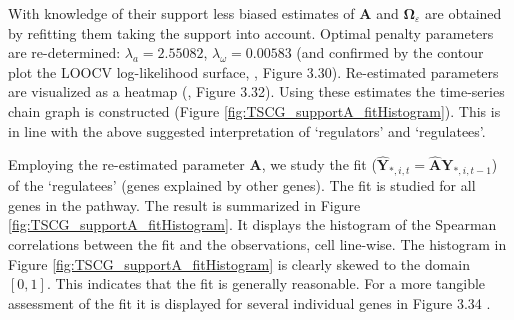 With knowledge of their support less biased estimates of $\mathbf{A}$ and $\mathbf{\Omega}_{\varepsilon}$ are obtained by refitting them taking the support into account. Optimal penalty parameters are re-determined: $\lambda_a=2.55082$, $\lambda_{\omega}=0.00583$ (and confirmed by the contour plot the LOOCV log-likelihood surface, \cite{Supp2018}, Figure 3.30). Re-estimated parameters are visualized as a heatmap (\cite{Supp2018}, Figure 3.32). Using these estimates the time-series chain graph is constructed (Figure \ref{fig:TSCG_supportA_fitHistogram}). This is in line with the above suggested interpretation of `regulators'  and `regulatees'. 


Employing the re-estimated parameter $\mathbf{A}$, we study the fit ($\hat{\mathbf{Y}}_{\ast, i, t} = \hat{\mathbf{A}} \mathbf{Y}_{\ast, i, t-1}$) of the `regulatees' (genes explained by other genes). The fit is studied for all genes in the pathway. The result is summarized in Figure \ref{fig:TSCG_supportA_fitHistogram}. It displays the histogram of the Spearman correlations between the fit and the observations, cell line-wise. The histogram in Figure \ref{fig:TSCG_supportA_fitHistogram} is clearly skewed to the domain $[0,1]$. This indicates that the fit is generally reasonable. For a more tangible assessment of the fit it is displayed for several individual genes in Figure 3.34 \cite{Supp2018}.

